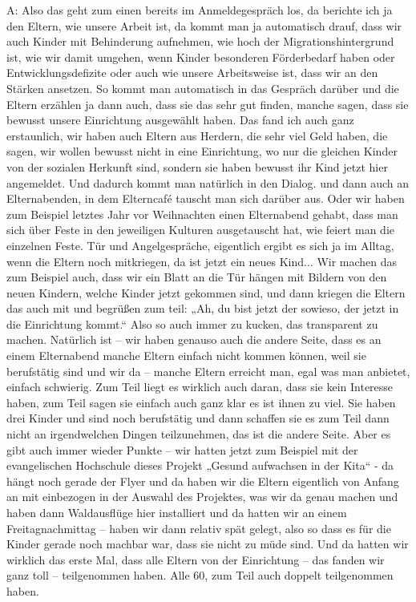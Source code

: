 A: Also das geht zum einen bereits im Anmeldegespräch los, da berichte ich ja den Eltern, wie unsere Arbeit ist, da kommt man ja automatisch drauf, dass wir auch Kinder mit Behinderung aufnehmen, wie hoch der Migrationshintergrund ist, wie wir damit umgehen, wenn Kinder besonderen Förderbedarf haben oder Entwicklungsdefizite oder auch wie unsere Arbeitsweise ist, dass wir an den Stärken ansetzen. So kommt man automatisch in das Gespräch darüber und die Eltern erzählen ja dann auch, dass sie das sehr gut finden, manche sagen, dass sie bewusst unsere Einrichtung ausgewählt haben. Das fand ich auch ganz erstaunlich, wir haben auch Eltern aus Herdern, die sehr viel Geld haben, die sagen, wir wollen bewusst nicht in eine Einrichtung, wo nur die gleichen Kinder von der sozialen Herkunft sind, sondern sie haben bewusst ihr Kind jetzt hier angemeldet. Und dadurch kommt man natürlich in den Dialog. und dann auch an Elternabenden, in dem Elterncafé tauscht man sich darüber aus. Oder wir haben zum Beispiel letztes Jahr vor Weihnachten einen Elternabend gehabt, dass man sich über Feste in den jeweiligen Kulturen ausgetauscht hat, wie feiert man die einzelnen Feste. Tür und Angelgespräche, eigentlich ergibt es sich ja im Alltag, wenn die Eltern noch mitkriegen, da ist jetzt ein neues Kind... Wir machen das zum Beispiel auch, dass wir ein Blatt an die Tür hängen mit Bildern von den neuen Kindern, welche Kinder jetzt gekommen sind, und dann kriegen die Eltern das auch mit und begrüßen zum teil: „Ah, du bist jetzt der sowieso, der jetzt in die Einrichtung kommt.“ 
Also  so auch immer zu kucken, das transparent zu machen. Natürlich ist – wir haben genauso auch die andere Seite, dass es an einem Elternabend manche Eltern einfach nicht kommen können, weil sie berufstätig sind und wir da – manche Eltern erreicht man, egal was man anbietet, einfach schwierig.  Zum Teil liegt es wirklich auch daran, dass sie kein Interesse haben, zum Teil sagen sie einfach auch ganz klar es ist ihnen zu viel. Sie haben drei Kinder und sind noch berufstätig und dann schaffen sie es zum Teil dann nicht an irgendwelchen Dingen teilzunehmen, das ist die andere Seite. Aber es gibt auch immer wieder Punkte – wir hatten jetzt zum Beispiel mit der evangelischen Hochschule dieses Projekt „Gesund aufwachsen in der Kita“ - da hängt noch gerade der Flyer und da haben wir die Eltern eigentlich von Anfang an mit einbezogen in der Auswahl des Projektes, was wir da genau machen und haben dann Waldausflüge hier installiert und da hatten wir an einem Freitagnachmittag – haben wir dann relativ spät gelegt, also so dass es für die Kinder gerade noch machbar war, dass sie nicht zu müde sind. Und da hatten wir wirklich das erste Mal, dass alle Eltern von der Einrichtung – das fanden wir ganz toll – teilgenommen haben. Alle 60, zum Teil auch doppelt teilgenommen haben.

